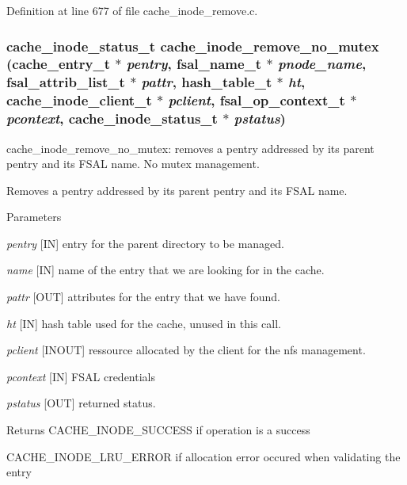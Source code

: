 Definition at line 677 of file cache\_\-inode\_\-remove.c.
\subsubsection[{cache\_\-inode\_\-remove\_\-no\_\-mutex}]{\setlength{\rightskip}{0pt plus 5cm}cache\_\-inode\_\-status\_\-t cache\_\-inode\_\-remove\_\-no\_\-mutex (cache\_\-entry\_\-t $\ast$ {\em pentry}, \/  fsal\_\-name\_\-t $\ast$ {\em pnode\_\-name}, \/  fsal\_\-attrib\_\-list\_\-t $\ast$ {\em pattr}, \/  hash\_\-table\_\-t $\ast$ {\em ht}, \/  cache\_\-inode\_\-client\_\-t $\ast$ {\em pclient}, \/  fsal\_\-op\_\-context\_\-t $\ast$ {\em pcontext}, \/  cache\_\-inode\_\-status\_\-t $\ast$ {\em pstatus})}\label{cache__inode__remove_8c_abc88903c5c3036d83b9a289b40e871b0}
cache\_\-inode\_\-remove\_\-no\_\-mutex: removes a pentry addressed by its parent pentry and its FSAL name. No mutex management.

Removes a pentry addressed by its parent pentry and its FSAL name.


\begin{DoxyParams}{Parameters}
\item[{\em pentry}][IN] entry for the parent directory to be managed. \item[{\em name}][IN] name of the entry that we are looking for in the cache. \item[{\em pattr}][OUT] attributes for the entry that we have found. \item[{\em ht}][IN] hash table used for the cache, unused in this call. \item[{\em pclient}][INOUT] ressource allocated by the client for the nfs management. \item[{\em pcontext}][IN] FSAL credentials \item[{\em pstatus}][OUT] returned status.\end{DoxyParams}
\begin{DoxyReturn}{Returns}
CACHE\_\-INODE\_\-SUCCESS if operation is a success \par
 

CACHE\_\-INODE\_\-LRU\_\-ERROR if allocation error occured when validating the entry 
\end{DoxyReturn}

